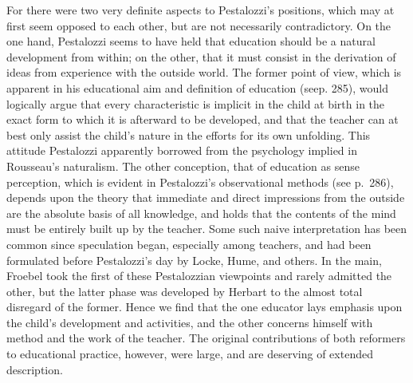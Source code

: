 \documentclass[
]{book}
\begin{document}
For there were two very definite aspects to Pestalozzi's positions, which may at first seem opposed to each other, but are not necessarily contradictory. On the one hand, Pestalozzi seems to have held that education should be a natural development from within; on the other, that it must consist in the derivation of ideas from experience with the outside world. The former point of view, which is apparent in his educational aim and definition of education (seep. 285), would logically argue that every characteristic is implicit in the child at birth in the exact form to which it is afterward to be developed, and that the teacher can at best only assist the child's nature in the efforts for its own unfolding. This attitude Pestalozzi apparently borrowed from the psychology implied in Rousseau's naturalism. The other conception, that of education as sense perception, which is evident in Pestalozzi's observational methods (see p.~286), depends upon the theory that immediate and direct impressions from the outside are the absolute basis of all knowledge, and holds that the contents of the mind must be entirely built up by the teacher. Some such naive interpretation has been common since speculation began, especially among teachers, and had been formulated before Pestalozzi's day by Locke, Hume, and others. In the main, Froebel took the first of these Pestalozzian viewpoints and rarely admitted the other, but the latter phase was developed by Herbart to the almost total disregard of the former. Hence we find that the one educator lays emphasis upon the child's development and activities, and the other concerns himself with method and the work of the teacher. The original contributions of both reformers to educational practice, however, were large, and are deserving of extended description.
\end{document}
